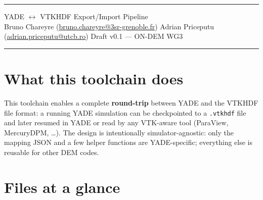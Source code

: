 \documentclass[10pt,a4paper]{article}
\begin{document}
\thispagestyle{empty}

{\color{PurpleMid}\rule{\linewidth}{1.2pt}}
\vspace{2pt}

\quad
{\large\sffamily\color{TealDark} YADE $\leftrightarrow$ VTKHDF Export/Import Pipeline}\\[2pt]
{\small\sffamily\color{GrayMid}
Bruno Chareyre
(\href{mailto:bruno.chareyre@3sr-grenoble.fr}{bruno.chareyre@3sr-grenoble.fr})\quad
Adrian Priceputu
(\href{mailto:adrian.priceputu@utcb.ro}{adrian.priceputu@utcb.ro})\quad
Draft v0.1 --- ON-DEM WG3}

{\color{PurpleMid}\rule{\linewidth}{1.2pt}}

\vspace{4pt}

\section{What this toolchain does}

This toolchain enables a complete \textbf{round-trip} between YADE and the
VTKHDF file format: a running YADE simulation can be checkpointed to a
\texttt{.vtkhdf} file and later resumed in YADE or read by any VTK-aware tool
(ParaView, MercuryDPM, \ldots). The design is intentionally
simulator-agnostic: only the mapping JSON and a few helper functions are
YADE-specific; everything else is reusable for other DEM codes.

\section{Files at a glance}
\end{document}
